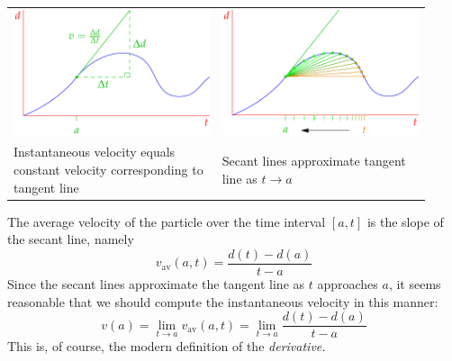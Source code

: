 \begin{center}
	\begin{tabular}{p{0.46\linewidth}@{\qquad}p{0.46\linewidth}}
		\includegraphics{diff-history}
		&
		\includegraphics{diff-history2}
		\\
		\centering Instantaneous velocity equals constant velocity corresponding to tangent line
		&
		\centering Secant lines approximate tangent line as $t\to a$
	\end{tabular}
\end{center}

The average velocity of the particle over the time interval $[a,t]$ is the slope of the secant line, namely
\[
	v_\text{av}(a,t)=\frac{d(t)-d(a)}{t-a}
\]
Since the secant lines approximate the tangent line as $t$ approaches $a$, it seems  reasonable that we should compute the instantaneous velocity in this manner:
\[
	v(a)=\lim_{t\to a}v_\text{av}(a,t)
	=\lim_{t\to a}\frac{d(t)-d(a)}{t-a}
\]
This is, of course, the modern definition of the \emph{derivative.}
\goodbreak


\setcounter{subsection}{27}
